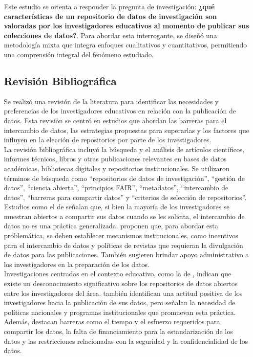 \documentclass{article}
\begin{document}
Este estudio se orienta a responder la pregunta de investigación: \textbf{¿qué características de un repositorio de datos de investigación son valoradas por los investigadores educativos al momento de publicar sus colecciones de datos?}. Para abordar esta interrogante, se diseñó una metodología mixta que integra enfoques cualitativos y cuantitativos, permitiendo una comprensión integral del fenómeno estudiado.\\

\subsection{Revisión Bibliográfica}
Se realizó una revisión de la literatura para identificar las necesidades y preferencias de los investigadores educativos en relación con la publicación de datos. Esta revisión se centró en estudios que abordan las barreras para el intercambio de datos, las estrategias propuestas para superarlas y los factores que influyen en la elección de repositorios por parte de los investigadores.\\
La revisión bibliográfica incluyó la búsqueda y el análisis de artículos científicos, informes técnicos, libros y otras publicaciones relevantes en bases de datos académicas, bibliotecas digitales y repositorios institucionales. Se utilizaron términos de búsqueda como ``repositorios de datos de investigación'', ``gestión de datos'', ``ciencia abierta'', ``principios FAIR'', ``metadatos'', ``intercambio de datos'', ``barreras para compartir datos'' y ``criterios de selección de repositorios''.\\

Estudios como el de \cite{barczak2022} señalan que, si bien la mayoría de los investigadores se muestran abiertos a compartir sus datos cuando se les solicita, el intercambio de datos no es una práctica generalizada. \cite{barczak2022} proponen que, para abordar esta problemática, se deben establecer mecanismos institucionales, como incentivos para el intercambio de datos y políticas de revistas que requieran la divulgación de datos para las publicaciones. También sugieren brindar apoyo administrativo a los investigadores en la preparación de los datos.\\

Investigaciones centradas en el contexto educativo, como la de \cite{casali2022}, indican que existe un desconocimiento significativo sobre los repositorios de datos abiertos entre los investigadores del área. \cite{casali2022} también identifican una actitud positiva de los investigadores hacia la publicación de sus datos, pero señalan la necesidad de políticas nacionales y programas institucionales que promuevan esta práctica. Además, destacan barreras como el tiempo y el esfuerzo requeridos para compartir los datos, la falta de financiamiento para la estandarización de los datos y las restricciones relacionadas con la seguridad y la confidencialidad de los datos.\\
\end{document}
